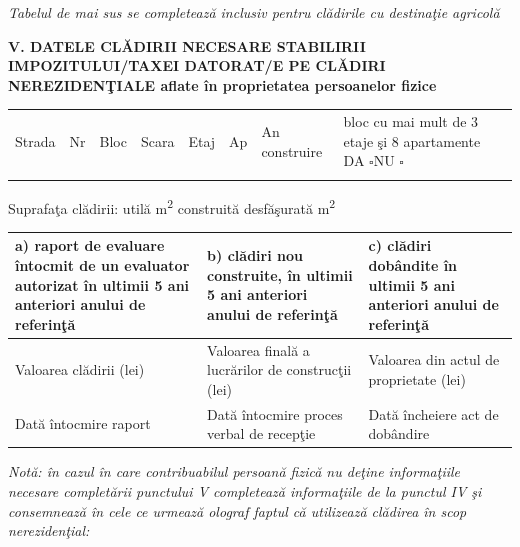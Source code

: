 \documentclass[10pt,a4paper,landscape]{article}
\newcommand{\fillline}[1][6cm]{\underline{\hspace{#1}}}
\newcommand{\checkboxempty}{$\square$}
\begin{document}
\footnotesize\textit{Tabelul de mai sus se completează inclusiv pentru clădirile cu destinaţie agricolă}\normalsize

\vspace{0.3cm}

\textbf{V. DATELE CLĂDIRII NECESARE STABILIRII IMPOZITULUI/TAXEI DATORAT/E PE CLĂDIRI NEREZIDENŢIALE aflate în proprietatea persoanelor fizice}

\begin{tabularx}{\textwidth}{|X|X|X|X|X|X|X|X|}
\hline
Strada & Nr & Bloc & Scara & Etaj & Ap & An construire & bloc cu mai mult de 3 etaje şi 8 apartamente DA \checkboxempty \quad NU \checkboxempty \\
\fillline[3cm] & \fillline[1cm] & \fillline[1cm] & \fillline[1cm] & \fillline[1cm] & \fillline[1cm] & \fillline[2cm] & \\
\hline
\end{tabularx}

Suprafaţa clădirii: utilă \fillline[3cm] m\textsuperscript{2} \hspace{1cm} construită desfăşurată \fillline[3cm] m\textsuperscript{2}

\vspace{0.3cm}

\begin{tabularx}{\textwidth}{|X|X|X|}
\hline
\textbf{a)} raport de evaluare întocmit de un evaluator autorizat în ultimii 5 ani anteriori anului de referinţă & \textbf{b)} clădiri nou construite, în ultimii 5 ani anteriori anului de referinţă & \textbf{c)} clădiri dobândite în ultimii 5 ani anteriori anului de referinţă \\
\hline
Valoarea clădirii (lei) \fillline[4cm] & Valoarea finală a lucrărilor de construcţii (lei) \fillline[3cm] & Valoarea din actul de proprietate (lei) \fillline[3cm] \\
\hline
Dată întocmire raport \fillline[3cm] & Dată întocmire proces verbal de recepţie \fillline[3cm] & Dată încheiere act de dobândire \fillline[3cm] \\
\hline
\end{tabularx}

\vspace{0.2cm}

\footnotesize\textit{Notă: în cazul în care contribuabilul persoană fizică nu deţine informaţiile necesare completării punctului V completează informaţiile de la punctul IV şi consemnează în cele ce urmează olograf faptul că utilizează clădirea în scop nerezidenţial:}\normalsize
\end{document}
